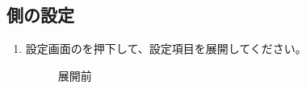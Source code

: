     \subsection{\bj 側の設定}
        \begin{enumerate}
            \item 設定画面のを押下して、設定項目を展開してください。
                \begin{figure}[htbp]
                    \begin{minipage}[b]{0.45\linewidth}
                        \centering
                        \caption{展開前}
                        \label{img:lastfm11}
                    \end{minipage}
                    \begin{minipage}[b]{0.45\linewidth}
                        \centering
\end{minipage}
\end{figure}
\end{enumerate}
